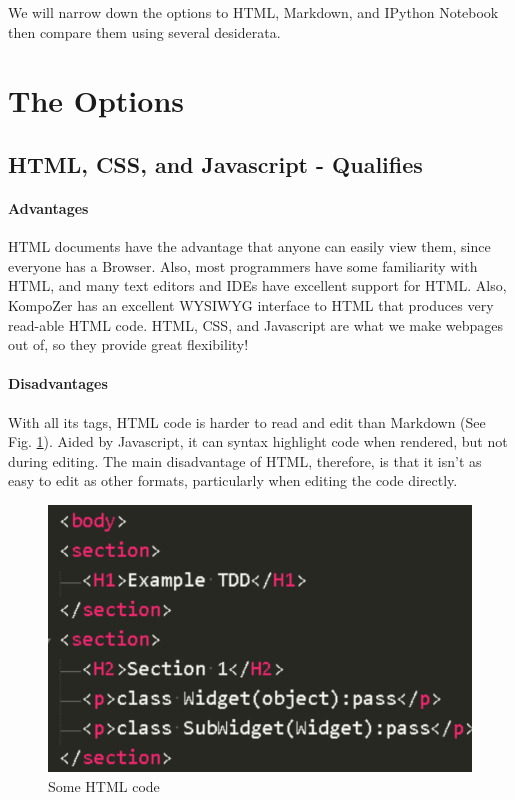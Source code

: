 \documentclass[]{article}
\begin{document}
We will narrow down the options to HTML, Markdown, and IPython Notebook then compare them using several desiderata.


\section{The Options}

\subsection{HTML, CSS, and Javascript - Qualifies}
	\paragraph{Advantages}
		HTML documents have the advantage that anyone can easily view them, since everyone has a Browser.  
		Also, most programmers have some familiarity with HTML, and many text editors and IDEs have excellent support for HTML.  
		Also, KompoZer has an excellent WYSIWYG interface to HTML that produces very read-able HTML code.  
		HTML, CSS, and Javascript are what we make webpages out of, so they provide great flexibility!
	\paragraph{Disadvantages}
		With all its tags, HTML code is harder to read and edit than Markdown (See Fig. \ref{HTML code}).  
		Aided by Javascript, it can syntax highlight code when rendered, but not during editing.  
		The main disadvantage of HTML, therefore, is that it isn't as easy to edit as other formats, particularly when editing the code directly.
		\begin{figure}[h]
			\centering
			\includegraphics[scale=.25]{HTML_code.PNG}
			\caption{Some HTML code}
			\label{HTML code}
		\end{figure}
		
\end{document}
